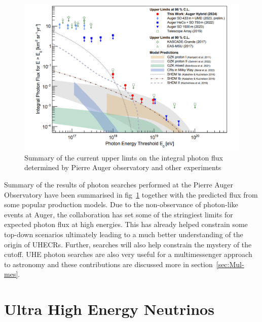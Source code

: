\begin{figure}[t!]
  \centering
  \includegraphics[width=14.5cm]{thesis_figures/CRnNu/Photon-limits.png}
  \caption{Summary of the current upper limts on the integral photon flux determined by Pierre Auger observatory and other experiments~\cite{PierreAuger:2024ayl}}
  \label{fig:Auger-Photon-limits}
\end{figure}

Summary of the results of photon searches performed at the Pierre Auger Observatory have been summarised in fig~\ref{fig:Auger-Photon-limits} together with the predicted flux from some popular production models. Due to the non-observance of photon-like events at Auger, the collaboration has set some of the stringiest limits for expected photon flux at high energies. This has already helped constrain some top-down scenarios ultimately leading to a much better understanding of the origin of UHECRs. Further, searches will also help constrain the mystery of the cutoff. UHE photon searches are also very useful for a multimessenger approach to astronomy and these contributions are discussed more in section~\ref{sec:Mul-mes}.


\section{Ultra High Energy Neutrinos}
\label{sec:UHENu}
